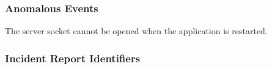 
\subsubsection{Anomalous Events}
The server socket cannot be opened when the application is restarted.


\subsubsection{Incident Report Identifiers}
